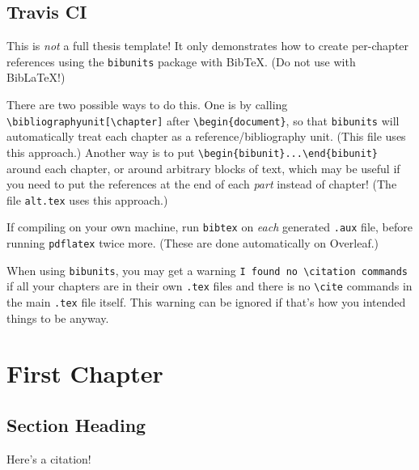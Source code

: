 \documentclass[11pt,oneside]{book}
\begin{document}
\section{Travis CI}

This is \emph{not} a full thesis template! It only demonstrates how to create per-chapter references using the \texttt{bibunits} package with BibTeX. (Do not use with BibLaTeX!)

There are two possible ways to do this. One is by calling \verb|\bibliographyunit[\chapter]| after \verb|\begin{document}|, so that \texttt{bibunits} will automatically treat each chapter as a reference/bibliography unit. (This file uses this approach.) Another way is to put \verb|\begin{bibunit}...\end{bibunit}| around each chapter, or around arbitrary blocks of text, which may be useful if you need to put the references at the end of each \textit{part} instead of chapter! (The file \texttt{alt.tex} uses this approach.)

If compiling on your own machine, run \texttt{bibtex} on \emph{each} generated \texttt{.aux} file, before running \texttt{pdflatex} twice more. (These are done automatically on Overleaf.)

When using \texttt{bibunits}, you may get a warning \verb|I found no \citation commands| if all your chapters are in their own \texttt{.tex} files and there is no \verb|\cite| commands in the main \texttt{.tex} file itself. This warning can be ignored if that's how you intended things to be anyway.

\tableofcontents

\mainmatter

\chapter{First Chapter}

\section{Section Heading}
Here's a citation! \citep{latex:companion}

\putbib
\end{document}

